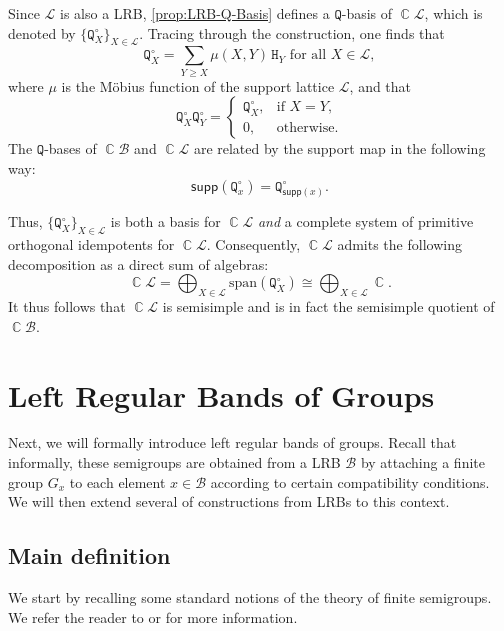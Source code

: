 \documentclass[11pt, oneside, reqno]{amsart}
\theoremstyle{definition}
\numberwithin{equation}{section}
\DeclareMathOperator{\C}{\mathbb{C}}
\def \BB{{\mathcal{B}}}
\def \kk{\C}
\def \lat{{\mathcal{L}}}
\def \supp{\mathsf{supp}}
\newcommand{\B}[1]{\mathtt{#1}} 			%
\begin{document}
Since $\lat$ is also a LRB, \cref{prop:LRB-Q-Basis} defines a $\B{Q}$-basis of $\kk\lat$,
which is denoted by $\{\B{Q}^\circ_{X}\}_{X \in \lat}$.
Tracing through the construction, one finds that
\begin{equation*}
    \B{Q}^\circ_X = \sum_{Y \geq X} \mu(X,Y) \, \B{H}_Y \text{ for all } X \in \lat,
\end{equation*}
where $\mu$ is the Möbius function of the support lattice $\lat$,
and that
\[
    \B{Q}^\circ_{X} \B{Q}^\circ_{Y} =
    \begin{cases}
        \B{Q}^\circ_{X}, & \text{if } X = Y, \\
        0,               & \text{otherwise.}
    \end{cases}
\]
The $\B{Q}$-bases of $\kk\BB$ and $\kk\lat$ are related by the support map in
the following way:
\begin{equation} \label{support-of-Q-basis}
    \supp(\B{Q}^\circ_{x}) = \B{Q}^\circ_{\supp(x)}.
\end{equation}

Thus, $\{\B{Q}^\circ_{X}\}_{X \in \lat}$ is both a basis for $\kk\lat$
\emph{and} a complete system of primitive orthogonal idempotents for $\kk\lat$.
Consequently, $\kk\lat$ admits the following decomposition as a direct sum of
algebras:
\begin{equation*}
    \kk\lat = \bigoplus_{X \in \lat} \mathrm{span}(\B{Q}^\circ_{X}) \cong \bigoplus_{X \in \lat} \kk.
\end{equation*}
It thus follows that $\kk\lat$ is semisimple and is in fact the semisimple quotient
of $\kk\BB$.

\section{Left Regular Bands of Groups}\label{sec:LRBG}

Next, we will formally introduce left regular bands of groups. Recall that informally, these semigroups are obtained from a LRB $\BB$ by attaching a finite group $G_x$ to each element $x \in \BB$ according to certain compatibility conditions.
We will then extend several of constructions from LRBs to this context.

\subsection{Main definition}

We start by recalling some standard notions of the theory of finite semigroups.
We refer the reader to \cite{clifford} or \cite[Appendix A]{RhSt09Semigroups} for more information.
\end{document}
